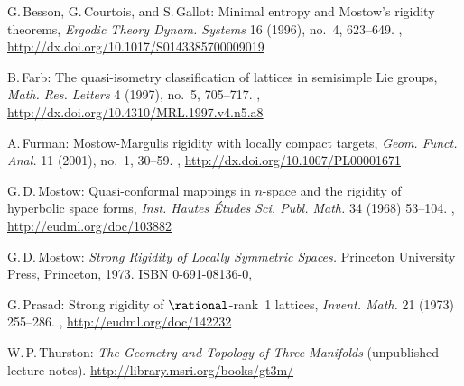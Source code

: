\begin{references}{9}

G.\,Besson, G.\,Courtois, and S.\,Gallot:
Minimal entropy and Mostow's rigidity theorems,
\emph{Ergodic Theory Dynam. Systems} 16 (1996), no.~4, 623--649. 
,
\url{http://dx.doi.org/10.1017/S0143385700009019}

 B.\,Farb:
 The quasi-isometry classification of lattices in
semisimple Lie groups,
 \emph{Math. Res. Letters} 4 (1997), no.~5, 705--717. 
 ,
 \maynewline
 \url{http://dx.doi.org/10.4310/MRL.1997.v4.n5.a8}
 
A.\,Furman:
Mostow-Margulis rigidity with locally compact targets,
\emph{Geom. Funct. Anal.} 11 (2001), no.~1, 30--59. 
,
\maynewline
\url{http://dx.doi.org/10.1007/PL00001671}

 G.\,D.\,Mostow: 
Quasi-conformal mappings in $n$-space and the rigidity of hyperbolic space forms,
\emph{Inst. Hautes \'Etudes Sci. Publ. Math.} 34 (1968) 53--104.
,
\maynewline
\url{http://eudml.org/doc/103882}

 G.\,D.\,Mostow: 
 \emph{Strong Rigidity of Locally Symmetric Spaces.}
 Princeton University Press, Princeton, 1973.
 ISBN 0-691-08136-0,

 G.\,Prasad:
 Strong rigidity of $\rational$-rank~1 lattices,
 \emph{Invent. Math.} 21 (1973) 255--286.
 ,
 \maynewline
 \url{http://eudml.org/doc/142232}
 
 W.\,P.\,Thurston:
 \emph{The Geometry and Topology of Three-Manifolds}
 (unpublished lecture notes).
 \url{http://library.msri.org/books/gt3m/}

\end{references}
